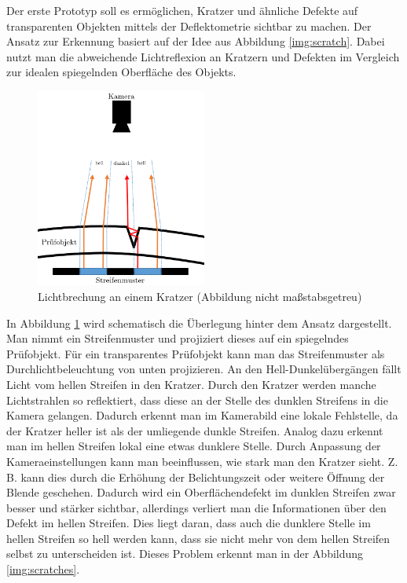Der erste Prototyp soll es ermöglichen, Kratzer und ähnliche Defekte auf transparenten Objekten mittels der Deflektometrie sichtbar zu machen.
Der Ansatz zur Erkennung basiert auf der Idee aus Abbildung \ref{img:scratch}.
Dabei nutzt man die abweichende Lichtreflexion an Kratzern und Defekten im Vergleich zur idealen spiegelnden Oberfläche des Objekts.

\begin{figure}[H]
	\centering
	\includegraphics[width=0.5\textwidth]{03_sichtpruefungDurchLichtreflexionen/verfahren/figures/scratch_reflection}
	\caption[Lichtbrechung an einem Kratzer]{Lichtbrechung an einem Kratzer (Abbildung nicht maßstabsgetreu)}
	\label{img:lightreflection}
\end{figure}

\noindent
In Abbildung \ref{img:lightreflection} wird schematisch die Überlegung hinter dem Ansatz dargestellt.
Man nimmt ein Streifenmuster und projiziert dieses auf ein spiegelndes Prüfobjekt.
Für ein transparentes Prüfobjekt kann man das Streifenmuster als Durchlichtbeleuchtung von unten projizieren.
An den Hell-Dunkelübergän\-gen fällt Licht vom hellen Streifen in den Kratzer.
Durch den Kratzer werden manche Lichtstrahlen so reflektiert, dass diese an der Stelle des dunklen Streifens in die Kamera gelangen.
Dadurch erkennt man im Kamerabild eine lokale Fehlstelle, da der Kratzer heller ist als der umliegende dunkle Streifen.
Analog dazu erkennt man im hellen Streifen lokal eine etwas dunklere Stelle.
Durch Anpassung der Kameraeinstellungen kann man beeinflussen, wie stark man den Kratzer sieht.
Z. B. kann dies durch die Erhöhung der Belichtungszeit oder weitere Öffnung der Blende geschehen.
Dadurch wird ein Oberflächendefekt im dunklen Streifen zwar besser und stärker sichtbar, allerdings verliert man die Informationen über den Defekt im hellen Streifen.
Dies liegt daran, dass auch die dunklere Stelle im hellen Streifen so hell werden kann, dass sie nicht mehr von dem hellen Streifen selbst zu unterscheiden ist.
Dieses Problem erkennt man in der Abbildung \ref{img:scratches}.

